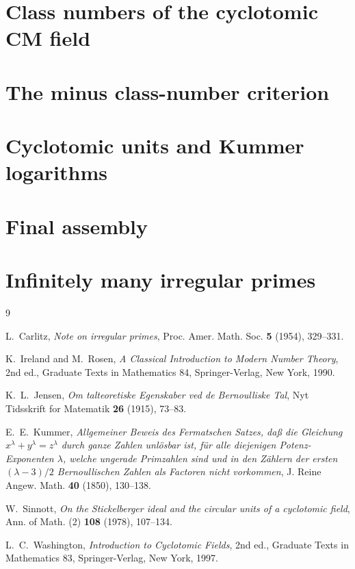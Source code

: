 \chapter{Class numbers of the cyclotomic CM field}\label{ch:cm}


\pagebreak
\chapter{The minus class-number criterion}\label{ch:hminus-formula}


\pagebreak
\chapter{Cyclotomic units and Kummer logarithms}\label{ch:cyclotomic-units}


\pagebreak
\chapter{Final assembly}\label{ch:kummer-final}


\pagebreak
\chapter{Infinitely many irregular primes}\label{ch:irregular-primes}


\begin{thebibliography}{9}

L.~Carlitz,
\emph{Note on irregular primes},
Proc. Amer. Math. Soc. \textbf{5} (1954), 329--331.

K.~Ireland and M.~Rosen,
\emph{A Classical Introduction to Modern Number Theory},
2nd ed., Graduate Texts in Mathematics 84, Springer-Verlag, New York, 1990.

K.~L.~Jensen,
\emph{Om talteoretiske Egenskaber ved de Bernoulliske Tal},
Nyt Tidsskrift for Matematik \textbf{26} (1915), 73--83.

E.~E.~Kummer,
\emph{Allgemeiner Beweis des Fermatschen Satzes, da{\ss} die Gleichung
$x^\lambda + y^\lambda = z^\lambda$ durch ganze Zahlen unl\"osbar ist,
f\"ur alle diejenigen Potenz-Exponenten $\lambda$, welche ungerade
Primzahlen sind und in den Z\"ahlern der ersten $(\lambda-3)/2$
Bernoullischen Zahlen als Factoren nicht vorkommen},
J. Reine Angew. Math. \textbf{40} (1850), 130--138.

W.~Sinnott,
\emph{On the Stickelberger ideal and the circular units of a cyclotomic
field},
Ann. of Math. (2) \textbf{108} (1978), 107--134.

L.~C.~Washington,
\emph{Introduction to Cyclotomic Fields},
2nd ed., Graduate Texts in Mathematics 83, Springer-Verlag, New York, 1997.

\end{thebibliography}
